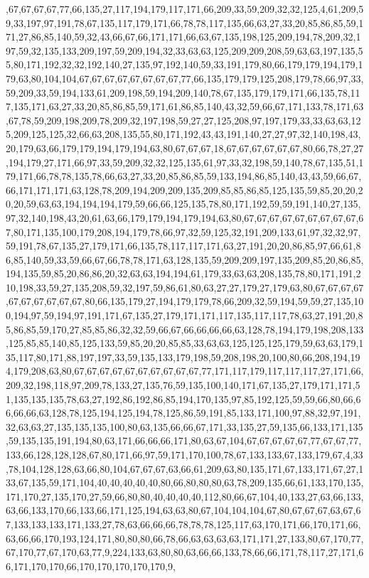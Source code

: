 ,67,67,67,67,77,66,135,27,117,194,179,117,171,66,209,33,59,209,32,32,125,4,61,209,59,33,197,97,191,78,67,135,117,179,171,66,78,78,117,135,66,63,27,33,20,85,86,85,59,171,27,86,85,140,59,32,43,66,67,66,171,171,66,63,67,135,198,125,209,194,78,209,32,197,59,32,135,133,209,197,59,209,194,32,33,63,63,125,209,209,208,59,63,63,197,135,55,80,171,192,32,32,192,140,27,135,97,192,140,59,33,191,179,80,66,179,179,194,179,179,63,80,104,104,67,67,67,67,67,67,67,67,77,66,135,179,179,125,208,179,78,66,97,33,59,209,33,59,194,133,61,209,198,59,194,209,140,78,67,135,179,179,171,66,135,78,117,135,171,63,27,33,20,85,86,85,59,171,61,86,85,140,43,32,59,66,67,171,133,78,171,63,67,78,59,209,198,209,78,209,32,197,198,59,27,27,125,208,97,197,179,33,33,63,63,125,209,125,125,32,66,63,208,135,55,80,171,192,43,43,191,140,27,27,97,32,140,198,43,20,179,63,66,179,179,194,179,194,63,80,67,67,67,18,67,67,67,67,67,67,80,66,78,27,27,194,179,27,171,66,97,33,59,209,32,32,125,135,61,97,33,32,198,59,140,78,67,135,51,179,171,66,78,78,135,78,66,63,27,33,20,85,86,85,59,133,194,86,85,140,43,43,59,66,67,66,171,171,171,63,128,78,209,194,209,209,135,209,85,85,86,85,125,135,59,85,20,20,20,20,59,63,63,194,194,194,179,59,66,66,125,135,78,80,171,192,59,59,191,140,27,135,97,32,140,198,43,20,61,63,66,179,179,194,179,194,63,80,67,67,67,67,67,67,67,67,67,67,80,171,135,100,179,208,194,179,78,66,97,32,59,125,32,191,209,133,61,97,32,32,97,59,191,78,67,135,27,179,171,66,135,78,117,117,171,63,27,191,20,20,86,85,97,66,61,86,85,140,59,33,59,66,67,66,78,78,171,63,128,135,59,209,209,197,135,209,85,20,86,85,194,135,59,85,20,86,86,20,32,63,63,194,194,61,179,33,63,63,208,135,78,80,171,191,210,198,33,59,27,135,208,59,32,197,59,86,61,80,63,27,27,179,27,179,63,80,67,67,67,67,67,67,67,67,67,67,80,66,135,179,27,194,179,179,78,66,209,32,59,194,59,59,27,135,100,194,97,59,194,97,191,171,67,135,27,179,171,171,117,135,117,117,78,63,27,191,20,85,86,85,59,170,27,85,85,86,32,32,59,66,67,66,66,66,66,63,128,78,194,179,198,208,133,125,85,85,140,85,125,133,59,85,20,20,85,85,33,63,63,125,125,125,179,59,63,63,179,135,117,80,171,88,197,197,33,59,135,133,179,198,59,208,198,20,100,80,66,208,194,194,179,208,63,80,67,67,67,67,67,67,67,67,67,67,77,171,117,179,117,117,117,27,171,66,209,32,198,118,97,209,78,133,27,135,76,59,135,100,140,171,67,135,27,179,171,171,51,135,135,135,78,63,27,192,86,192,86,85,194,170,135,97,85,192,125,59,59,66,80,66,66,66,66,63,128,78,125,194,125,194,78,125,86,59,191,85,133,171,100,97,88,32,97,191,32,63,63,27,135,135,135,100,80,63,135,66,66,67,171,33,135,27,59,135,66,133,171,135,59,135,135,191,194,80,63,171,66,66,66,171,80,63,67,104,67,67,67,67,67,77,67,67,77,133,66,128,128,128,67,80,171,66,97,59,171,170,100,78,67,133,133,67,133,179,67,4,33,78,104,128,128,63,66,80,104,67,67,67,63,66,61,209,63,80,135,171,67,133,171,67,27,133,67,135,59,171,104,40,40,40,40,40,80,66,80,80,80,63,78,209,135,66,61,133,170,135,171,170,27,135,170,27,59,66,80,80,40,40,40,40,112,80,66,67,104,40,133,27,63,66,133,63,66,133,170,66,133,66,171,125,194,63,63,80,67,104,104,104,67,80,67,67,67,63,67,67,133,133,133,171,133,27,78,63,66,66,66,78,78,78,125,117,63,170,171,66,170,171,66,63,66,66,170,193,124,171,80,80,80,66,78,66,63,63,63,63,171,171,27,133,80,67,170,77,67,170,77,67,170,63,77,9,224,133,63,80,80,63,66,66,133,78,66,66,171,78,117,27,171,66,171,170,170,66,170,170,170,170,170,9,